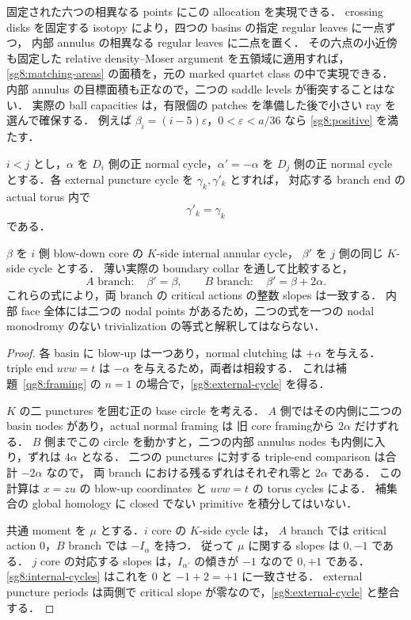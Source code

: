 固定された六つの相異なる points にこの allocation を実現できる．
crossing disks を固定する isotopy により，四つの basins の指定 regular leaves に一点ずつ，
内部 annulus の相異なる regular leaves に二点を置く．
その六点の小近傍も固定した relative density--Moser argument を五領域に適用すれば，
\eqref{sg8:matching-areas} の面積を，元の marked quartet class の中で実現できる．
内部 annulus の目標面積も正なので，二つの saddle levels が衝突することはない．
実際の ball capacities は，有限個の patches を準備した後で小さい ray を選んで確保する．
例えば $\beta_i=(i-5)\varepsilon$，$0<\varepsilon<a/36$ なら
\eqref{sg8:positive} を満たす．

\begin{proposition}
\label{sg8:framing}
$i<j$ とし，$\alpha$ を $D_i$ 側の正 normal cycle，$\alpha'=-\alpha$ を
$D_j$ 側の正 normal cycle とする．各 external puncture cycle を $\gamma_k,\gamma'_k$ とすれば，
対応する branch end の actual torus 内で
\begin{equation}\label{sg8:external-cycle}
 \gamma'_k=\gamma_k
\end{equation}
である．

$\beta$ を $i$ 側 blow-down core の $K$-side internal annular cycle，
$\beta'$ を $j$ 側の同じ $K$-side cycle とする．
薄い実際の boundary collar を通して比較すると，
\begin{equation}\label{sg8:internal-cycles}
 A\text{ branch}:\quad\beta'=\beta,\qquad
 B\text{ branch}:\quad\beta'=\beta+2\alpha.
\end{equation}
これらの式により，両 branch の critical actions の整数 slopes は一致する．
内部 face 全体には二つの nodal points があるため，二つの式を一つの
nodal monodromy のない trivialization の等式と解釈してはならない．
\end{proposition}

\begin{proof}
各 basin に blow-up は一つあり，normal clutching は $+\alpha$ を与える．
triple end $uvw=t$ は $-\alpha$ を与えるため，両者は相殺する．
これは補題~\ref{qg8:framing} の $n=1$ の場合で，\eqref{sg8:external-cycle} を得る．

$K$ の二 punctures を囲む正の base circle を考える．
$A$ 側ではその内側に二つの basin nodes があり，actual normal framing は
旧 core framingから $2\alpha$ だけずれる．
$B$ 側までこの circle を動かすと，二つの内部 annulus nodes も内側に入り，ずれは $4\alpha$ となる．
二つの punctures に対する triple-end comparison は合計 $-2\alpha$ なので，
両 branch における残るずれはそれぞれ零と $2\alpha$ である．
この計算は $x=zu$ の blow-up coordinates と $uvw=t$ の torus cycles による．
補集合の global homology に closed でない primitive を積分してはいない．

共通 moment を $\mu$ とする．$i$ core の $K$-side cycle は，
$A$ branch では critical action $0$，$B$ branch では $-I_\alpha$ を持つ．
従って $\mu$ に関する slopes は $0,-1$ である．
$j$ core の対応する slopes は，$I_{\alpha'}$ の傾きが $-1$ なので $0,+1$ である．
\eqref{sg8:internal-cycles} はこれを $0$ と $-1+2=+1$ に一致させる．
external puncture periods は両側で critical slope が零なので，\eqref{sg8:external-cycle} と整合する．
\end{proof}

